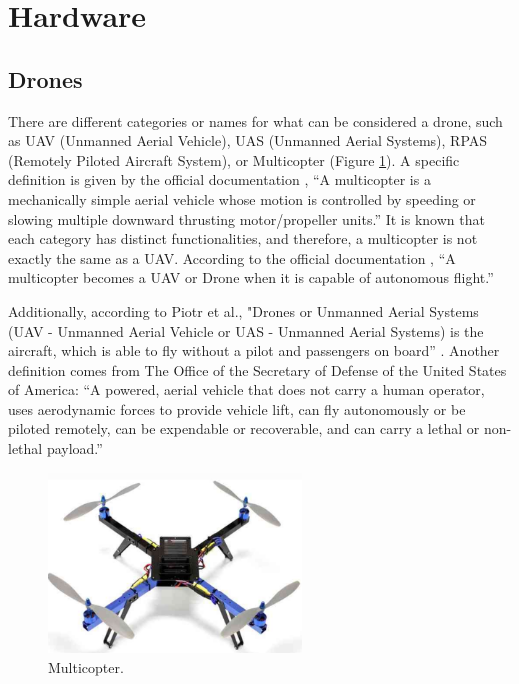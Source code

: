 
\section{Hardware}

\subsection{Drones}

    There are different categories or names for what can be considered a drone, such as UAV (Unmanned Aerial Vehicle), UAS (Unmanned Aerial Systems), RPAS (Remotely Piloted Aircraft System), or Multicopter (Figure \ref{fig:multicopter}). A specific definition is given by the official documentation \cite{ardupilot}, “A multicopter is a mechanically simple aerial vehicle whose motion is controlled by speeding or slowing multiple downward thrusting motor/propeller units.” It is known that each category has distinct functionalities, and therefore, a multicopter is not exactly the same as a UAV. According to the official documentation \cite{ardupilot}, “A multicopter becomes a UAV or Drone when it is capable of autonomous flight.”

    Additionally, according to Piotr et al., "Drones or Unmanned Aerial Systems (UAV - Unmanned Aerial Vehicle or UAS - Unmanned Aerial Systems) is the aircraft, which is able to fly without a pilot and passengers on board” \cite{piotr_drones}. Another definition comes from The Office of the Secretary of Defense of the United States of America: “A powered, aerial vehicle that does not carry a human operator, uses aerodynamic forces to provide vehicle lift, can fly autonomously or be piloted remotely, can be expendable or recoverable, and can carry a lethal or non-lethal payload.”

    \begin{figure}[H]
        \centering
        \includegraphics[width=0.6\textwidth]{pictures/multicopter.png}
        \caption{Multicopter.}
        \label{fig:multicopter}
    \end{figure}

